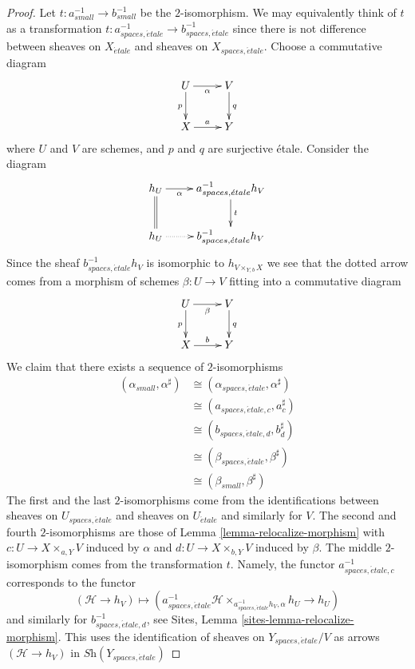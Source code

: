 \begin{proof}
Let $t : a_{small}^{-1} \to b_{small}^{-1}$ be the $2$-isomorphism.
We may equivalently think of $t$ as a transformation
$t : a_{spaces, \acute{e}tale}^{-1} \to b_{spaces, \acute{e}tale}^{-1}$
since there is not difference between sheaves on $X_{\acute{e}tale}$
and sheaves on $X_{spaces, \acute{e}tale}$.
Choose a commutative diagram
$$
\xymatrix{
U \ar[d]_p \ar[r]_\alpha  & V \ar[d]^q \\
X \ar[r]^a & Y
}
$$
where $U$ and $V$ are schemes, and $p$ and $q$ are surjective \'etale.
Consider the diagram
$$
\xymatrix{
h_U \ar[r]_-\alpha \ar@{=}[d] & a_{spaces, \acute{e}tale}^{-1}h_V \ar[d]^t \\
h_U \ar@{..>}[r] & b_{spaces, \acute{e}tale}^{-1}h_V
}
$$
Since the sheaf $b_{spaces, \acute{e}tale}^{-1}h_V$ is isomorphic to
$h_{V \times_{Y, b} X}$ we see that the dotted arrow comes from a
morphism of schemes
$\beta : U \to V$ fitting into a commutative diagram
$$
\xymatrix{
U \ar[d]_p \ar[r]_\beta  & V \ar[d]^q \\
X \ar[r]^b & Y
}
$$
We claim that there exists a sequence of $2$-isomorphisms
\begin{align*}
(\alpha_{small}, \alpha^\sharp)
& \cong 
(\alpha_{spaces, \acute{e}tale}, \alpha^\sharp) \\
& \cong
(a_{spaces, \acute{e}tale, c}, a_c^\sharp) \\
& \cong
(b_{spaces, \acute{e}tale, d}, b_d^\sharp) \\
& \cong
(\beta_{spaces, \acute{e}tale}, \beta^\sharp) \\
& \cong
(\beta_{small}, \beta^\sharp)
\end{align*}
The first and the last $2$-isomorphisms come from the identifications
between sheaves on $U_{spaces, \acute{e}tale}$ and sheaves on
$U_{\acute{e}tale}$ and similarly for $V$. The second and fourth
$2$-isomorphisms are those of
Lemma \ref{lemma-relocalize-morphism}
with $c : U \to X \times_{a, Y} V$ induced by $\alpha$ and
$d : U \to X \times_{b, Y} V$ induced by $\beta$.
The middle $2$-isomorphism comes from the transformation $t$.
Namely, the functor $a_{spaces, \acute{e}tale, c}^{-1}$ corresponds
to the functor
$$
(\mathcal{H} \to h_V) \longmapsto
(a_{spaces, \acute{e}tale}^{-1}\mathcal{H}
\times_{a_{spaces, \acute{e}tale}^{-1}h_V, \alpha}
h_U \to
h_U)
$$
and similarly for $b_{spaces, \acute{e}tale, d}^{-1}$, see
Sites, Lemma \ref{sites-lemma-relocalize-morphism}.
This uses the identification of sheaves on $Y_{spaces, \acute{e}tale}/V$
as arrows $(\mathcal{H} \to h_V)$ in $\textit{Sh}(Y_{spaces, \acute{e}tale})$

\end{proof}
